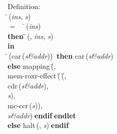 \begin{tabbing}{\sc Definition}: \\  
\=\,({\it{ins\/}}, {\it{s\/}}) \\ 
$=$$\;\;\;\;$\=\,({\it{ins\/}}) \\ 
{\bf then }\=\=\,({}, {\it{ins\/}}, {\it{s\/}})\- \\ 
{\bf in} \\ 
\=\,({\rm{car}}\,({\it{s\&addr\/}}))$\;\;${\bf then }{\rm{car}}\,({\it{s\&addr\/}}) \\ 
{\bf else }{\rm{mapping}}\,(\=, \\ 
{\rm{mem-roxr-effect}}\,(\=\,(\=, \\ 
{\rm{cdr}}\,({\it{s\&addr\/}}), \\ 
{\it{s\/}})\-, \\ 
{\rm{mc-ccr}}\,({\it{s\/}}))\-, \\ 
{\it{s\&addr\/}})\-$\;${\bf  endif}\-$\;${\bf  endlet}\- \\ 
{\bf else }{\rm{halt}}\,({}, {\it{s\/}})$\;${\bf  endif}\-\-
\end{tabbing}

